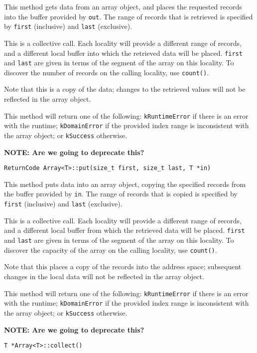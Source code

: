 \noindent This method gets data from an array object, and places the requested
records into the buffer provided by \texttt{out}. The range of records that is
retrieved is specified by \texttt{first} (inclusive) and \texttt{last}
(exclusive).

This is a collective call. Each locality will provide a different range of
records, and a different local buffer into which the retrieved data will be
placed. \texttt{first} and \texttt{last} are given in terms of the segment of
the array on this locality. To discover the number of records on the calling
locality, use \texttt{count()}.

Note that this is a copy of the data; changes to the retrieved values
will not be reflected in the array object.

This method will return one of the following: \texttt{kRuntimeError} if there
is an error with the runtime; \texttt{kDomainError} if the provided index range
is inconsistent with the array object; or \texttt{kSuccess} otherwise.

{\bf NOTE: Are we going to deprecate this?}

\begin{lstlisting}
ReturnCode Array<T>::put(size_t first, size_t last, T *in)
\end{lstlisting}

\noindent This method puts data into an array object, copying the specified
records from the buffer provided by \texttt{in}. The range of records that is
copied is specified by \texttt{first} (inclusive) and \texttt{last} (exclusive).

This is a collective call. Each locality will provide a different range of
records, and a different local buffer from which the retrieved data will be
placed. \texttt{first} and \texttt{last} are given in terms of the segment of
the array on this locality. To discover the capacity of the array on the
calling locality, use \texttt{count()}.

Note that this places a copy of the records into the address space;
subsequent changes in the local data will not be reflected in the array object.

This method will return one of the following: \texttt{kRuntimeError} if there
is an error with the runtime; \texttt{kDomainError} if the provided index
range is inconsistent with the array object; or \texttt{kSuccess} otherwise.

{\bf NOTE: Are we going to deprecate this?}

\begin{lstlisting}
T *Array<T>::collect()
\end{lstlisting}

